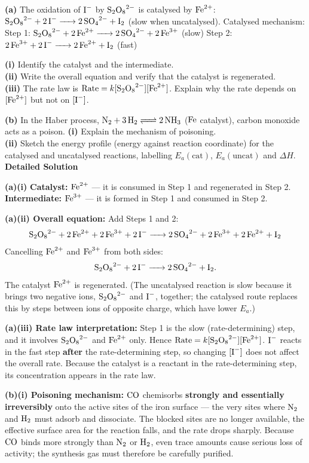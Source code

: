 \documentclass[11pt]{article}
\begin{document}
\begin{exoresolu}
\textbf{(a)} The oxidation of $\ce{I-}$ by $\ce{S2O8^2-}$ is catalysed by $\ce{Fe^{2+}}$:
$\ce{S2O8^2- + 2I- -> 2SO4^2- + I2}$ (slow when uncatalysed).
Catalysed mechanism:
Step 1: $\ce{S2O8^2- + 2Fe^{2+} -> 2SO4^2- + 2Fe^{3+}}$ (slow)
Step 2: $\ce{2Fe^{3+} + 2I- -> 2Fe^{2+} + I2}$ (fast)

\textbf{(i)} Identify the catalyst and the intermediate. \\
\textbf{(ii)} Write the overall equation and verify that the catalyst is regenerated. \\
\textbf{(iii)} The rate law is $\text{Rate} = k[\ce{S2O8^2-}][\ce{Fe^{2+}}]$. Explain why the rate depends on $[\ce{Fe^{2+}}]$ but not on $[\ce{I-}]$.

\textbf{(b)} In the Haber process, $\ce{N2 + 3H2 <=> 2NH3}$ ($\ce{Fe}$ catalyst), carbon monoxide acts as a poison.
\textbf{(i)} Explain the mechanism of poisoning. \\
\textbf{(ii)} Sketch the energy profile (energy against reaction coordinate) for the catalysed and uncatalysed reactions, labelling $E_a(\text{cat})$, $E_a(\text{uncat})$ and $\Delta H$.
\tcblower
\textbf{Detailed Solution}

\textbf{(a)(i)} \textbf{Catalyst:} $\ce{Fe^{2+}}$ — it is consumed in Step 1 and regenerated in Step 2. \textbf{Intermediate:} $\ce{Fe^{3+}}$ — it is formed in Step 1 and consumed in Step 2.

\textbf{(a)(ii) Overall equation:} Add Steps 1 and 2:
\[ \ce{S2O8^2- + 2Fe^{2+} + 2Fe^{3+} + 2I- -> 2SO4^2- + 2Fe^{3+} + 2Fe^{2+} + I2} \]
Cancelling $\ce{Fe^{2+}}$ and $\ce{Fe^{3+}}$ from both sides:
\[ \ce{S2O8^2- + 2I- -> 2SO4^2- + I2}. \]
The catalyst $\ce{Fe^{2+}}$ is regenerated. (The uncatalysed reaction is slow because it brings two negative ions, $\ce{S2O8^2-}$ and $\ce{I-}$, together; the catalysed route replaces this by steps between ions of opposite charge, which have lower $E_a$.)

\textbf{(a)(iii) Rate law interpretation:} Step 1 is the slow (rate-determining) step, and it involves $\ce{S2O8^2-}$ and $\ce{Fe^{2+}}$ only. Hence $\text{Rate} = k[\ce{S2O8^2-}][\ce{Fe^{2+}}]$. $\ce{I-}$ reacts in the fast step \textbf{after} the rate-determining step, so changing $[\ce{I-}]$ does not affect the overall rate. Because the catalyst is a reactant in the rate-determining step, its concentration appears in the rate law.

\textbf{(b)(i) Poisoning mechanism:} $\ce{CO}$ chemisorbs \textbf{strongly and essentially irreversibly} onto the active sites of the iron surface — the very sites where $\ce{N2}$ and $\ce{H2}$ must adsorb and dissociate. The blocked sites are no longer available, the effective surface area for the reaction falls, and the rate drops sharply. Because $\ce{CO}$ binds more strongly than $\ce{N2}$ or $\ce{H2}$, even trace amounts cause serious loss of activity; the synthesis gas must therefore be carefully purified.


\end{exoresolu}
\end{document}

